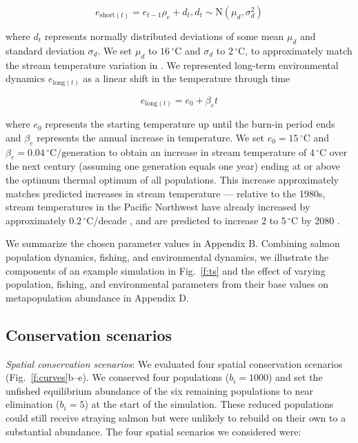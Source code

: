 \documentclass[12pt,english]{article}
\newcommand{\somparam}{Appendix B}
\newcommand{\somsens}{Appendix D}
\begin{document}
\begin{spacing}{1.9}
\[e_{\mathrm{short}(t)} = e_{t-1} \rho_e + d_t, d_t \sim \mathrm{N}(\mu_d, \sigma_d^2)\]

\noindent
where $d_t$ represents normally distributed deviations of some mean $\mu_d$ and standard deviation $\sigma_d$. We set $\mu_d$ to $16\,^{\circ}\mathrm{C}$ and $\sigma_d$ to $2\,^{\circ}\mathrm{C}$, to approximately match the stream temperature variation in \citet{eliason2011}. We represented long-term environmental dynamics $e_{\mathrm{long}(t)}$ as a linear shift in the temperature through time

\[e_{\mathrm{long}(t)} = e_0 + \beta_e t\]

\noindent
where $e_0$ represents the starting temperature up until the burn-in period ends and $\beta_e$ represents the annual increase in temperature. We set $e_0 = 15\,^{\circ}\mathrm{C}$ and $\beta_e = 0.04\,^{\circ}\mathrm{C} / \mathrm{generation}$ to obtain an increase in stream temperature of $4\,^{\circ}\mathrm{C}$ over the next century (assuming one generation equals one year) ending at or above the optimum thermal optimum of all populations. This increase approximately matches predicted increases in stream temperature --- relative to the 1980s, stream temperatures in the Pacific Northwest have already increased by approximately $0.2\,^{\circ}\mathrm{C}$/decade \citep{isaak2012}, and are predicted to increase $2$ to $5\,^{\circ}\mathrm{C}$ by 2080 \citep{mantua2010}.

We summarize the chosen parameter values in \somparam. Combining salmon population dynamics, fishing, and environmental dynamics, we illustrate the components of an example simulation in Fig.~\ref{f:ts} and the effect of varying population, fishing, and environmental parameters from their base values on metapopulation abundance in \somsens.

\subsection{Conservation scenarios}\label{conservation-scenarios}

\emph{Spatial conservation scenarios}: We evaluated four spatial conservation scenarios (Fig.~\ref{f:curves}b--e). We conserved four populations ($b_i = 1000$) and set the unfished equilibrium abundance of the six remaining populations to near elimination ($b_i = 5$) at the start of the simulation. These reduced populations could still receive straying salmon but were unlikely to rebuild on their own to a substantial abundance. The four spatial scenarios we considered were:


\end{spacing}
\end{document}
